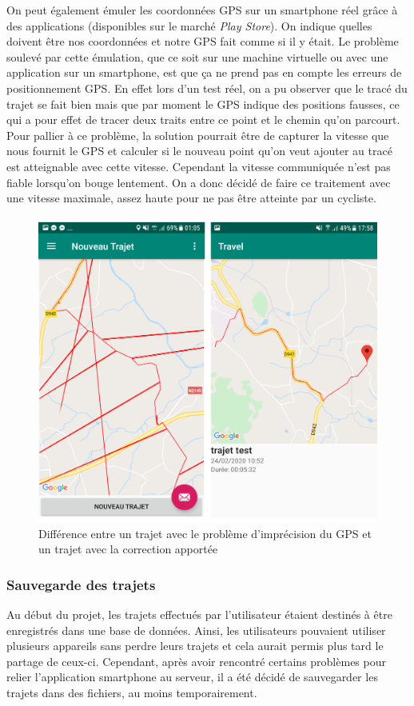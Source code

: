 On peut également émuler les coordonnées GPS sur un smartphone réel grâce à des applications (disponibles sur le marché \emph{Play Store}).
On indique quelles doivent être nos coordonnées et notre GPS fait comme si il y était. Le problème soulevé par cette émulation, que ce soit
sur une machine virtuelle ou avec une application sur un smartphone, est que ça ne prend pas en compte les erreurs de positionnement GPS.
En effet lors d'un test réel, on a pu observer que le tracé du trajet se fait bien mais que par moment le GPS indique des positions fausses,
ce qui a pour effet de tracer deux traits entre ce point et le chemin qu'on parcourt. Pour pallier à ce problème, la solution pourrait être
de capturer la vitesse que nous fournit le GPS et calculer si le nouveau point qu'on veut ajouter au tracé est atteignable avec cette vitesse.
Cependant la vitesse communiquée n'est pas fiable lorsqu'on bouge lentement. On a donc décidé de faire ce traitement avec une vitesse maximale,
assez haute pour ne pas être atteinte par un cycliste.
\begin{figure}[ht]
    \label{Différence entre avant et après correction}
    \centering
    \includegraphics[scale=0.6]{images/avant-apres.png}
    \caption{Différence entre un trajet avec le problème d'imprécision du GPS et un trajet avec la correction apportée}
\end{figure}

\subsubsection{Sauvegarde des trajets}
Au début du projet, les trajets effectués par l'utilisateur étaient destinés à être enregistrés dans une base de données. Ainsi, les utilisateurs
pouvaient utiliser plusieurs appareils sans perdre leurs trajets et cela aurait permis plus tard le partage de ceux-ci. Cependant, après avoir
rencontré certains problèmes pour relier l'application smartphone au serveur, il a été décidé de sauvegarder les trajets dans des fichiers,
au moins temporairement.

